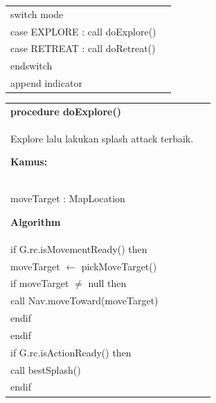 \documentclass{article}
\newenvironment{pseudobox}
{
\centering
\begin{longtable}{|p{0.94\linewidth}|}
\hline
}
{
\\ \hline
\end{longtable}
\vspace{0.05cm}
}
\begin{document}
\begin{pseudobox}
\hspace*{1em} switch mode \\
\hspace*{2em} case EXPLORE : call doExplore() \\
\hspace*{2em} case RETREAT : call doRetreat() \\
\hspace*{1em} endswitch \\

\hspace*{1em} append indicator
\end{pseudobox}

\begin{pseudobox}
\textbf{procedure doExplore()} \\
{ Explore lalu lakukan splash attack terbaik. }

\textbf{Kamus:} \\
\hspace*{1em} moveTarget : MapLocation

\textbf{Algorithm} \\
\hspace*{1em} if G.rc.isMovementReady() then \\
\hspace*{2em} moveTarget $\leftarrow$ pickMoveTarget() \\
\hspace*{2em} if moveTarget $\neq$ null then \\
\hspace*{3em} call Nav.moveToward(moveTarget) \\
\hspace*{2em} endif \\
\hspace*{1em} endif \\

\hspace*{1em} if G.rc.isActionReady() then \\
\hspace*{2em} call bestSplash() \\
\hspace*{1em} endif
\end{pseudobox}
\end{document}
